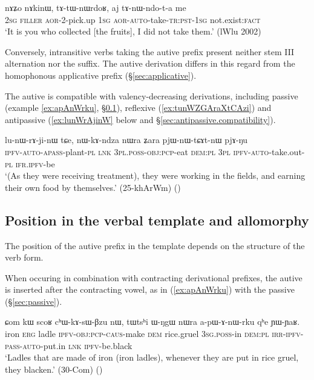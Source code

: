  \begin{exe}
\ex \label{ex:aj.tAnWndota.me}
\gll nɤʑo nɤkinɯ, tɤ-tɯ-nɯrdoʁ, aj tɤ-nɯ-ndo-t-a me\\
\textsc{2sg} \textsc{filler} \textsc{aor}-2-pick.up  \textsc{1sg}  \textsc{aor}-\textsc{auto}-take-\textsc{tr}:\textsc{pst}-\textsc{1sg} not.exist:\textsc{fact}\\
\glt `It is you who collected [the fruits], I did not take them.' (lWlu 2002)
\end{exe}

Conversely, intransitive verbs taking the autive prefix present neither stem III alternation nor the  suffix. The autive derivation differs in this regard from the homophonous  applicative prefix (§\ref{sec:applicative}).

The autive is compatible with valency-decreasing derivations, including passive (example \ref{ex:apAnWrku}, §\ref{sec:autoben.position}), reflexive (\ref{ex:tunWZGAraXtCAzi}) and antipassive (\ref{ex:lunWrAjinW} below and §\ref{sec:antipassive.compatibility}).

 \begin{exe}
\ex \label{ex:lunWrAjinW}
\gll lu-nɯ-rɤ-ji-nɯ tɕe, nɯ-kɤ-ndza nɯra ʑara pjɯ-nɯ-tɕɤt-nɯ pjɤ-ŋu \\
\textsc{ipfv}-\textsc{auto}-\textsc{apass}-plant-\textsc{pl} \textsc{lnk} \textsc{3pl}.\textsc{poss}-\textsc{obj}:\textsc{pcp}-eat \textsc{dem}:\textsc{pl} \textsc{3pl} \textsc{ipfv}-\textsc{auto}-take.out-\textsc{pl} \textsc{ifr}.\textsc{ipfv}-be \\
\glt  `(As they were receiving treatment), they were working in the fields, and earning their own food by themselves.' (25-khArWm) 
()
\end{exe}

\subsection{Position in the verbal template and allomorphy}  \label{sec:autoben.position}
 

The position of the autive prefix in the template depends on the structure of the verb form. 

When occuring in combination with contracting derivational prefixes, the autive  is inserted after the contracting vowel, as in (\ref{ex:apAnWrku}) with the passive  (§\ref{sec:passive}).

 \begin{exe}
\ex \label{ex:apAnWrku}
\gll ɕom kɯ scoʁ cʰɯ-kɤ-sɯ-βzu nɯ, tɯtsʰi ɯ-ŋgɯ nɯra a-pɯ-ɤ-nɯ-rku qʰe ɲɯ-ɲaʁ.  \\
iron \textsc{erg} ladle \textsc{ipfv}-\textsc{obj}:\textsc{pcp}-\textsc{caus}-make \textsc{dem} rice.gruel \textsc{3sg}.\textsc{poss}-in \textsc{dem}:\textsc{pl} \textsc{irr}-\textsc{ipfv}-\textsc{pass}-\textsc{auto}-put.in \textsc{lnk} \textsc{ipfv}-be.black \\
\glt `Ladles that are made of iron (iron ladles), whenever they are put in rice gruel, they blacken.' (30-Com) ()
\end{exe}

